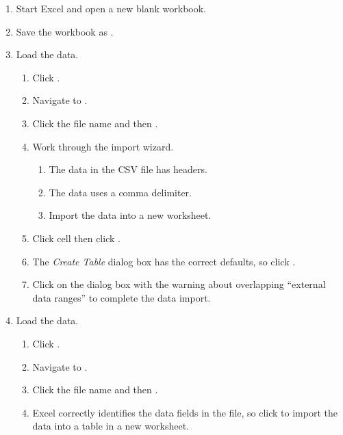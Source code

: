 \begin{enumbox}
	\begin{enumerate}
		\item Start Excel and open a new blank workbook.
		\item Save the workbook as .
	
		\item {} Load the data.
		\begin{enumerate}		
			\item Click .
			\item Navigate to .
			\item Click the file name and then .
			\item Work through the import wizard.
			
			\begin{enumerate}
				\item The data in the CSV file has headers.
				\item The data uses a comma delimiter.
				\item Import the data into a new worksheet.
			\end{enumerate}
		
			\item Click cell  then click .
			\item The \textit{Create Table} dialog box has the correct defaults, so click .
			\item Click  on the dialog box with the warning about overlapping ``external data ranges'' to complete the data import.
		\end{enumerate}
	
		\item {} Load the data.
		\begin{enumerate}
			\item Click .
			\item Navigate to .
			\item Click the file name and then .
			\item Excel correctly identifies the data fields in the file, so click  to import the data into a table in a new worksheet.	
		\end{enumerate}		
			

\end{enumerate}
\end{enumbox}
